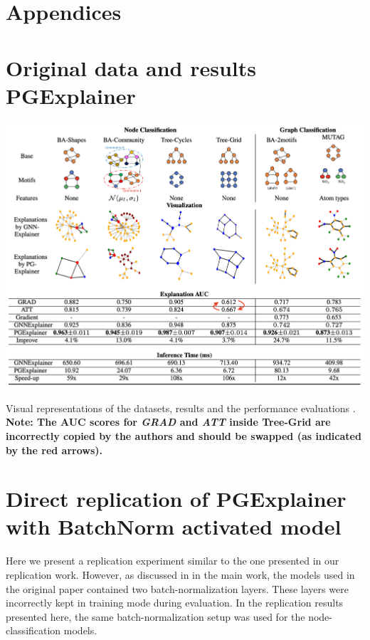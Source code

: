 \newpage
\appendix
\section*{Appendices}
\section{Original data and results PGExplainer}\label{appendix:A}


\begin{table}[h]
    \centering
    \includegraphics[width=1\linewidth]{../openreview/imgs/results2.png}
    \caption{Visual representations of the datasets, results and the performance evaluations \cite{luo2020parameterized}. \textbf{Note: The AUC scores for \textit{GRAD} and \textit{ATT} inside Tree-Grid are incorrectly copied by the authors and should be swapped (as indicated by the red arrows).}}
    \label{tab:results}
\end{table}

\section{Direct replication of PGExplainer with BatchNorm activated model} \label{appendix:batch_norm}
Here we present a replication experiment similar to the one presented in our replication work. However, as discussed in in the main work, the models used in the original paper contained two batch-normalization layers. These layers were incorrectly kept in training mode during evaluation. In the replication results presented here, the same batch-normalization setup was used for the node-classification models. 

